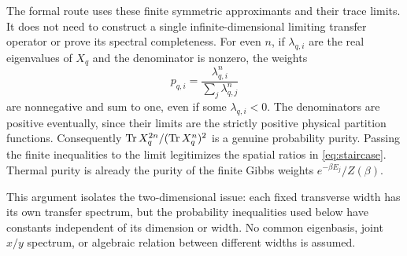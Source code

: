 The formal route uses these finite symmetric approximants and their trace
limits. It does not need to construct a single infinite-dimensional limiting
transfer operator or prove its spectral completeness.
For even $n$, if $\lambda_{q,i}$ are the real eigenvalues of $X_q$ and the
denominator is nonzero, the weights
\begin{equation}\label{eq:spatialweights}
 p_{q,i}=\frac{\lambda_{q,i}^{n}}{\sum_j\lambda_{q,j}^{n}}
\end{equation}
are nonnegative and sum to one, even if some $\lambda_{q,i}<0$.
The denominators are positive eventually, since their limits are the strictly
positive physical partition functions. Consequently
$\operatorname{Tr} X_q^{2n}/(\operatorname{Tr} X_q^n)^2$ is a genuine probability purity.
Passing the finite inequalities to the limit legitimizes the spatial ratios
in \eqref{eq:staircase}. Thermal purity is already the purity of the finite
Gibbs weights $e^{-\beta E_j}/Z(\beta)$.

This argument isolates the two-dimensional issue: each fixed transverse width
has its own transfer spectrum, but the probability inequalities used below
have constants independent of its dimension or width. No common eigenbasis,
joint $x/y$ spectrum, or algebraic relation between different widths is assumed.
